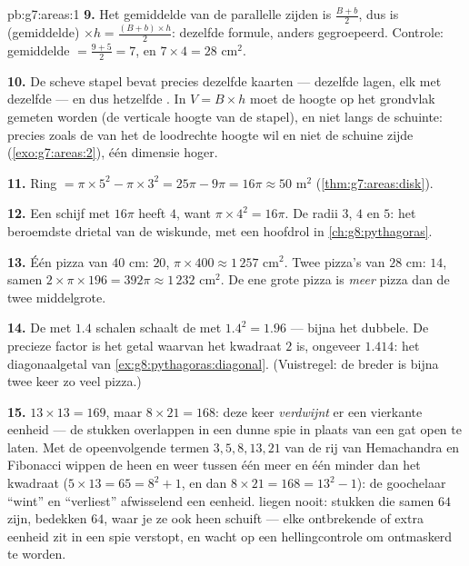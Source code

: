 \begin{solution}{pb:g7:areas:1}
\textbf{9.} Het gemiddelde van de parallelle zijden is $\frac{B + b}{2}$, dus is
(gemiddelde) $\times h = \frac{(B+b) \times h}{2}$: dezelfde formule, anders
gegroepeerd. Controle: gemiddelde $= \frac{9+5}{2} = 7$, en $7 \times 4 = 28$ cm$^2$.

\textbf{10.} De scheve stapel bevat precies dezelfde kaarten --- dezelfde lagen, elk
met dezelfde  --- en dus hetzelfde . In $V = B \times h$ moet de
hoogte \emph{} op het grondvlak gemeten worden (de verticale hoogte van de
stapel), en niet langs de schuinte: precies zoals de  van het
 de loodrechte hoogte wil en niet de schuine zijde
(\cref{exo:g7:areas:2}), één dimensie hoger.

\textbf{11.} Ring $= \pi \times 5^2 - \pi \times 3^2 = 25\pi - 9\pi = 16\pi \approx
50$ m$^2$ (\cref{thm:g7:areas:disk}).

\textbf{12.} Een schijf met  $16\pi$ heeft  $4$, want
$\pi \times 4^2 = 16\pi$. De radii $3$, $4$ en $5$: het beroemdste drietal van de
wiskunde, met een hoofdrol in \cref{ch:g8:pythagoras}.

\textbf{13.} Één pizza van $40$ cm:  $20$, 
$\pi \times 400 \approx 1\,257$ cm$^2$. Twee pizza's van $28$ cm:  $14$, samen
$2 \times \pi \times 196 = 392\pi \approx 1\,232$ cm$^2$. De ene grote pizza is
\emph{meer} pizza dan de twee middelgrote.

\textbf{14.} De  met $1.4$ schalen schaalt de  met
$1.4^2 = 1.96$ --- bijna het dubbele. De precieze factor is het getal waarvan het
kwadraat $2$ is, ongeveer $1.414$: het diagonaalgetal van
\cref{ex:g8:pythagoras:diagonal}. (Vuistregel: de  breder is bijna twee keer zo
veel pizza.)

\textbf{15.} $13 \times 13 = 169$, maar $8 \times 21 = 168$: deze keer
\emph{verdwijnt} er een vierkante eenheid --- de stukken overlappen in een dunne spie
in plaats van een gat open te laten. Met de opeenvolgende termen $3, 5, 8, 13, 21$ van
de rij van Hemachandra en Fibonacci wippen de  heen en weer tussen één meer en
één minder dan het kwadraat ($5 \times 13 = 65 = 8^2 + 1$, en dan
$8 \times 21 = 168 = 13^2 - 1$): de goochelaar ``wint'' en ``verliest'' afwisselend een
eenheid.  liegen nooit: stukken die samen $64$ zijn, bedekken $64$, waar je
ze ook heen schuift --- elke ontbrekende of extra eenheid zit in een spie verstopt, en
wacht op een hellingcontrole om ontmaskerd te worden.
\end{solution}

